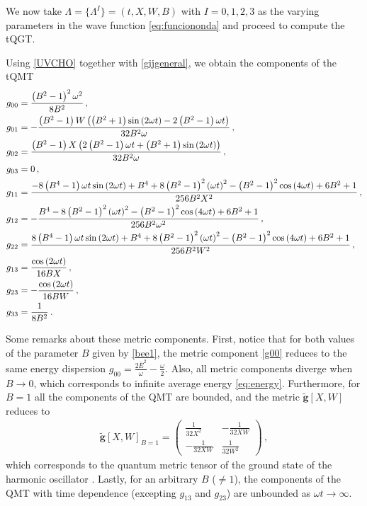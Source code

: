 \documentclass[12pt]{iopart}
\begin{document}
We now take $\Lambda=\{\Lambda^I\}= (t, X, W, B)$ with $I=0,1,2,3$ as the varying parameters in the wave function \eqref{eq:funciononda} and proceed to compute the tQGT.

Using  \eqref{UVCHO} together with  \eqref{gijgeneral}, we obtain the components of the tQMT
\begin{subequations} \allowdisplaybreaks
\begin{align}
g_{00}&=\frac{\left(B^2-1\right)^2\omega^2}{8 B^2} \label{g00}\,,\\
g_{01}&=-\frac{\left(B^2-1\right) W \left(\left(B^2+1\right) \sin \left(2  \omega t\right)-2 \left(B^2-1\right)  \omega t \right)}{32 B^2 \omega} \,,\\
g_{02}&=\frac{\left(B^2-1\right) X \left(2 \left(B^2-1\right)  \omega t+\left(B^2+1\right) \sin \left(2  \omega t \right)\right)}{32 B^2 \omega}\,, \\
g_{03}&=0 \,, \\
g_{11} &=\frac{-8 \left(B^4-1\right)  \omega t  \sin \left(2  \omega t \right)+B^4+8 \left(B^2-1\right)^2 \left( \omega t \right)^2 -\left(B^2-1\right)^2 \cos \left(4  \omega t \right)+6 B^2+1}{256 B^2 X^2}\,,\\
g_{12} &=-\frac{B^4-8 \left(B^2-1\right)^2 \left( \omega t \right)^2 -\left(B^2-1\right)^2 \cos \left(4 \omega t \right)+6 B^2+1}{256 B^2 \omega^2 }\,,\\
\label{g22}
g_{22} &=\frac{8 \left(B^4-1\right)  \omega t \sin \left(2  \omega t\right)+B^4+8 \left(B^2-1\right)^2 \left( \omega t \right)^2-\left(B^2-1\right)^2 \cos \left(4  \omega t \right)+6 B^2+1}{256 B^2 W^2}\,,\\
g_{13} &=\frac{\cos \left(2  \omega t \right)}{16 B X}\,,\\
g_{23} &=-\frac{\cos \left( 2 \omega t \right)}{16 B W}\,,\\
g_{33} &=\frac{1}{8 B^2}\,.
\end{align}
\end{subequations}

Some remarks about these metric components. First, notice that for both values of the parameter $B$ given by \eqref{bee1}, the metric component \eqref{g00} reduces to the same energy dispersion $g_{00}= \frac{2 \bar E^2}{\omega}-\frac{\omega}{2}$. Also, all metric components diverge when $B \to 0$, which corresponds to infinite average energy \eqref{eq:energy}. Furthermore, for $B=1$ all the components of the QMT are bounded, and the metric $\tilde{\boldsymbol{g}}[X,W]$ reduces to
\begin{align}\label{QMT_B1}
\tilde{\boldsymbol{g}}[X,W]_{B=1}=\left(
\begin{array}{cc}
\frac{1}{32X^2} & -\frac{1}{32XW}  \\
 -\frac{1}{32XW} & \frac{1}{32W^2}
\end{array}
\right)\,,
\end{align}
which corresponds to the quantum metric tensor of the ground state of the harmonic oscillator \cite{Juarez}. Lastly, for an arbitrary $B$ ($\neq1$), the components of the QMT with time dependence (excepting $g_{13}$ and $g_{23}$) are unbounded as $ \omega t \to \infty$. 
\end{document}
